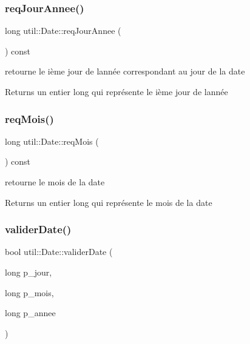 \subsubsection{\texorpdfstring{req\+Jour\+Annee()}{reqJourAnnee()}}
{\footnotesize\ttfamily long util\+::\+Date\+::req\+Jour\+Annee (\begin{DoxyParamCaption}{ }\end{DoxyParamCaption}) const}



retourne le ième jour de l\textquotesingle{}année correspondant au jour de la date 

\begin{DoxyReturn}{Returns}
un entier long qui représente le ième jour de l\textquotesingle{}année 
\end{DoxyReturn}
\mbox{\label{classutil_1_1Date_a8002c391b812945da68b16cb4a424460}} 
\subsubsection{\texorpdfstring{req\+Mois()}{reqMois()}}
{\footnotesize\ttfamily long util\+::\+Date\+::req\+Mois (\begin{DoxyParamCaption}{ }\end{DoxyParamCaption}) const}



retourne le mois de la date 

\begin{DoxyReturn}{Returns}
un entier long qui représente le mois de la date 
\end{DoxyReturn}
\mbox{\label{classutil_1_1Date_af4b4dde01395754245a42483358cb538}} 
\subsubsection{\texorpdfstring{valider\+Date()}{validerDate()}}
{\footnotesize\ttfamily bool util\+::\+Date\+::valider\+Date (\begin{DoxyParamCaption}\item[{long}]{p\+\_\+jour,  }\item[{long}]{p\+\_\+mois,  }\item[{long}]{p\+\_\+annee }\end{DoxyParamCaption})\hspace{0.3cm}{\ttfamily [static]}}



